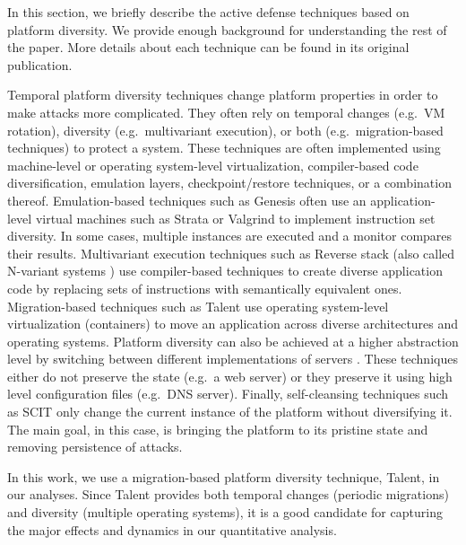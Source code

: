 \documentclass{acm_proc_article-sp}
\begin{document}
In this section, we briefly describe the active defense techniques based on platform diversity. We provide enough background for understanding the rest of the paper. More details about each technique can be found in its original publication.

Temporal platform diversity techniques change platform properties in order to make attacks more complicated. They often rely on temporal changes (e.g.~VM rotation), diversity (e.g.~multivariant execution), or both (e.g.~migration-based techniques) to protect a system. These techniques are often implemented using machine-level or operating system-level virtualization, compiler-based code diversification, emulation layers, checkpoint/restore techniques, or a combination thereof. Emulation-based techniques such as Genesis \cite{genesis} often use an application-level virtual machines such as Strata \cite{strata} or Valgrind \cite{valgrind} to implement instruction set diversity. In some cases, multiple instances are executed and a monitor compares their results. Multivariant execution techniques such as Reverse stack \cite{reversestack} (also called N-variant systems \cite{nvariant}) use compiler-based 
techniques to create diverse application code by replacing sets of instructions with semantically equivalent ones. Migration-based techniques such as Talent \cite{talent} use operating system-level virtualization (containers) to move an application across diverse architectures and operating systems. Platform diversity can also be achieved at a higher abstraction level by switching between different implementations of servers \cite{webserver}. These techniques either do not preserve the state (e.g.~a web server) or they preserve it using high level configuration files (e.g.~DNS server). Finally, self-cleansing techniques such as SCIT \cite{scit} only change the current instance of the platform without diversifying it. The main goal, in this case, is bringing the platform to its pristine state and removing persistence of attacks.

In this work, we use a migration-based platform diversity technique, Talent, in our analyses. Since Talent provides both temporal changes (periodic migrations) and diversity (multiple operating systems), it is a good candidate for capturing the major effects and dynamics in our quantitative analysis.
\end{document}
